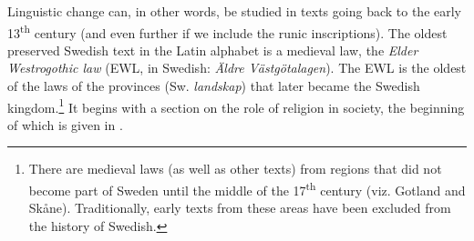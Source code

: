 \documentclass[output=paper]{langscibook}
\begin{document}
Linguistic change can, in other words, be studied in texts going back to the early 13\textsuperscript{th} century (and even further if we include the runic inscriptions). The oldest preserved Swedish text in the Latin alphabet is a medieval law, the \textit{Elder Westrogothic law} (EWL, in Swedish: \textit{Äldre Västgötalagen}). The EWL is the oldest of the laws of the provinces (Sw. \textit{landskap}) that later became the Swedish kingdom.\footnote{There are medieval laws (as well as other texts) from regions that did not become part of Sweden until the middle of the 17\textsuperscript{th} century (viz. Gotland and Skåne). Traditionally, early texts from these areas have been excluded from the history of Swedish.} It begins with a section on the role of religion in society, the beginning of which is given in .
\end{document}
